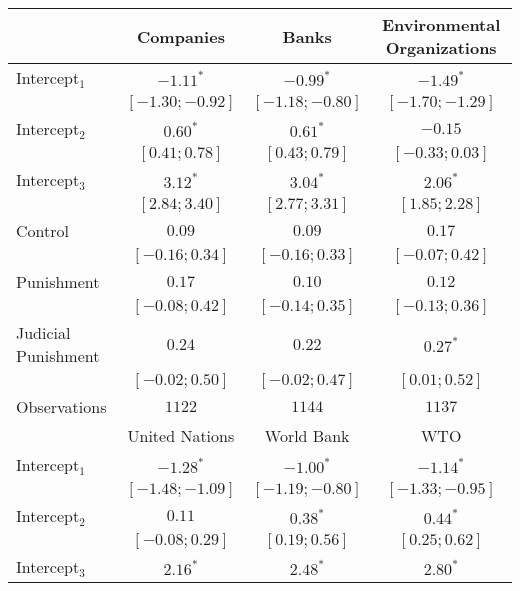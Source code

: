 \begin{table}[h]
\begin{center}
\begin{threeparttable}
\begin{tabular}{l c c c}
\hline
 & Companies & Banks & Environmental
Organizations \\
\hline
Intercept$_1$       & $-1.11^{*}$       & $-0.99^{*}$       & $-1.49^{*}$       \\
                    & $ [-1.30; -0.92]$ & $ [-1.18; -0.80]$ & $ [-1.70; -1.29]$ \\
Intercept$_2$       & $0.60^{*}$        & $0.61^{*}$        & $-0.15$           \\
                    & $ [ 0.41;  0.78]$ & $ [ 0.43;  0.79]$ & $ [-0.33;  0.03]$ \\
Intercept$_3$       & $3.12^{*}$        & $3.04^{*}$        & $2.06^{*}$        \\
                    & $ [ 2.84;  3.40]$ & $ [ 2.77;  3.31]$ & $ [ 1.85;  2.28]$ \\
Control             & $0.09$            & $0.09$            & $0.17$            \\
                    & $ [-0.16;  0.34]$ & $ [-0.16;  0.33]$ & $ [-0.07;  0.42]$ \\
Punishment          & $0.17$            & $0.10$            & $0.12$            \\
                    & $ [-0.08;  0.42]$ & $ [-0.14;  0.35]$ & $ [-0.13;  0.36]$ \\
Judicial Punishment & $0.24$            & $0.22$            & $0.27^{*}$        \\
                    & $ [-0.02;  0.50]$ & $ [-0.02;  0.47]$ & $ [ 0.01;  0.52]$ \\
\hline
Observations        & $1122$            & $1144$            & $1137$            \\
\hline
 & United Nations & World Bank & WTO \\
\hline
Intercept$_1$       & $-1.28^{*}$       & $-1.00^{*}$       & $-1.14^{*}$       \\
                    & $ [-1.48; -1.09]$ & $ [-1.19; -0.80]$ & $ [-1.33; -0.95]$ \\
Intercept$_2$       & $0.11$            & $0.38^{*}$        & $0.44^{*}$        \\
                    & $ [-0.08;  0.29]$ & $ [ 0.19;  0.56]$ & $ [ 0.25;  0.62]$ \\
Intercept$_3$       & $2.16^{*}$        & $2.48^{*}$        & $2.80^{*}$        \\

\end{tabular}
\end{threeparttable}
\end{center}
\end{table}
